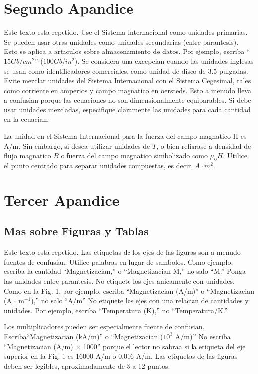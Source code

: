 \documentclass[5p,times,authoryear]{elsarticle}
\begin{document}
\section{Segundo Apandice}

Este texto esta repetido. Use el Sistema Internacional como unidades primarias. Se pueden usar
otras unidades como unidades secundarias (entre parantesis). Esto se
aplica a artaculos sobre almacenamiento de datos. Por ejemplo,
escriba ``$15 Gb/cm^2$'' ($100 Gb/in^2$). Se considera una excepcian
cuando las unidades inglesas se usan como identificadores
comerciales, como unidad de disco de 3.5 pulgadas. Evite mezclar
unidades del Sistema Internacional con el Sistema Cegesimal, tales
como corriente en amperios y campo magnatico en  oersteds. Esto a
menudo lleva a confusian porque las ecuaciones no son
dimensionalmente equiparables. Si debe usar unidades mezcladas,
especifique claramente las unidades para cada cantidad  en la
ecuacian.

La unidad en el Sistema Internacional para la fuerza del campo
magnatico H es A/m. Sin embargo, si desea utilizar unidades de $T$,
o bien refiarase a densidad de flujo magnatico $B$ o fuerza del
campo magnatico simbolizado como $\mu_0 H$. Utilice el punto
centrado para separar unidades compuestas,  es decir, $A\cdot m^2$.

\section{Tercer Apandice}

\subsection{Mas sobre Figuras y Tablas}

Este texto esta repetido. Las etiquetas de los ejes de las figuras son a menudo fuentes de
confusian. Utilice palabras en lugar de sambolos. Como ejemplo,
escriba la cantidad ``Magnetizacian,'' o ``Magnetizacian M,'' no
salo ``M.'' Ponga las unidades entre parantesis. No etiquete los
ejes anicamente con unidades. Como en la Fig. 1, por ejemplo,
escriba ``Magnetizacian (A/m)'' o ``Magnetizacian (A $\cdot$
m$^{-1}$),'' no salo ``A/m'' No etiquete los ejes con una relacian
de cantidades y unidades. Por ejemplo, escriba ``Temperatura (K),''
no ``Temperatura/K.''

Los multiplicadores pueden ser especialmente fuente de confusian.
Escriba``Magnetizacian (kA/m)'' o ``Magnetizacian ($10^3$ A/m).'' No
escriba ``Magnetizacian (A/m) $\times$ 1000'' porque el lector no
sabraa si la etiqueta del eje superior en la Fig. 1 es 16000 A/m o
0.016 A/m. Las etiquetas de las figuras deben ser legibles,
aproximadamente de 8 a 12 puntos.
\end{document}
